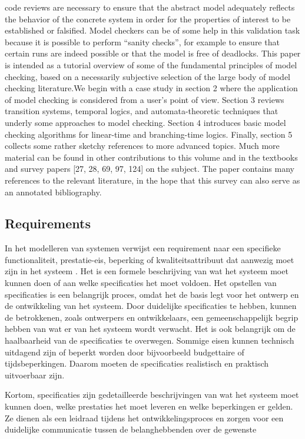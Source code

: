 \documentclass{article}
\begin{document}
	code reviews are necessary to ensure that the abstract model adequately reflects the
	behavior of the concrete system in order for the properties of interest to be established
	or falsified. Model checkers can be of some help in this validation task because it is
	possible to perform “sanity checks”, for example to ensure that certain runs are indeed
	possible or that the model is free of deadlocks.
	This paper is intended as a tutorial overview of some of the fundamental principles
	of model checking, based on a necessarily subjective selection of the large body of
	model checking literature.We begin with a case study in section 2 where the application
	of model checking is considered from a user’s point of view. Section 3 reviews transition
	systems, temporal logics, and automata-theoretic techniques that underly some approaches
	to model checking. Section 4 introduces basic model checking algorithms for
	linear-time and branching-time logics. Finally, section 5 collects some rather sketchy
	references to more advanced topics. Much more material can be found in other contributions
	to this volume and in the textbooks and survey papers [27, 28, 69, 97, 124] on
	the subject. The paper contains many references to the relevant literature, in the hope
	that this survey can also serve as an annotated bibliography.
	\subsection{Requirements}
	In het modelleren van systemen verwijst een requirement naar een specifieke functionaliteit, prestatie-eis, beperking of kwaliteitsattribuut dat aanwezig moet zijn in het systeem \cite{kotonya1998requirements}. Het is een formele beschrijving van wat het systeem moet kunnen doen of aan welke specificaties het moet voldoen.
		Het opstellen van specificaties\cite{kotonya1998requirements} is een belangrijk proces, omdat het de basis legt voor het ontwerp en de ontwikkeling van het systeem. Door duidelijke specificaties te hebben, kunnen de betrokkenen, zoals ontwerpers en ontwikkelaars, een gemeenschappelijk begrip hebben van wat er van het systeem wordt verwacht.
	Het is ook belangrijk om de haalbaarheid van de specificaties te overwegen. Sommige eisen kunnen technisch uitdagend zijn of beperkt worden door bijvoorbeeld budgettaire of tijdsbeperkingen. Daarom moeten de specificaties realistisch en praktisch uitvoerbaar zijn.
	
	Kortom, specificaties zijn gedetailleerde beschrijvingen van wat het systeem moet kunnen doen, welke prestaties het moet leveren en welke beperkingen er gelden. Ze dienen als een leidraad tijdens het ontwikkelingsproces en zorgen voor een duidelijke communicatie tussen de belanghebbenden over de gewenste
	
\end{document}
